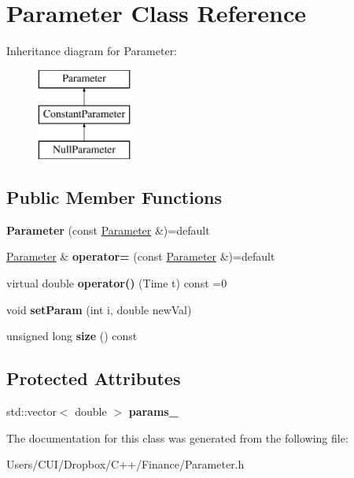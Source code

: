 \hypertarget{class_parameter}{}\section{Parameter Class Reference}
\label{class_parameter}
Inheritance diagram for Parameter\+:\begin{figure}[H]
\begin{center}
\leavevmode
\includegraphics[height=3.000000cm]{class_parameter}
\end{center}
\end{figure}
\subsection*{Public Member Functions}
\begin{DoxyCompactItemize}
\item 
\hypertarget{class_parameter_a07b46a4af924cbaea806505343d7b83a}{}\label{class_parameter_a07b46a4af924cbaea806505343d7b83a} 
{\bfseries Parameter} (const \hyperlink{class_parameter}{Parameter} \&)=default
\item 
\hypertarget{class_parameter_ac7e34f069ed1474901fce2f06e0ee54f}{}\label{class_parameter_ac7e34f069ed1474901fce2f06e0ee54f} 
\hyperlink{class_parameter}{Parameter} \& {\bfseries operator=} (const \hyperlink{class_parameter}{Parameter} \&)=default
\item 
\hypertarget{class_parameter_ae6317fac3d0b5e69101eb7059d151ca7}{}\label{class_parameter_ae6317fac3d0b5e69101eb7059d151ca7} 
virtual double {\bfseries operator()} (Time t) const =0
\item 
\hypertarget{class_parameter_a8cebb26e89537b098c8b42ef9aeb0f66}{}\label{class_parameter_a8cebb26e89537b098c8b42ef9aeb0f66} 
void {\bfseries set\+Param} (int i, double new\+Val)
\item 
\hypertarget{class_parameter_ae1ca6e3ab5f2d2ed3bffbdee6e941068}{}\label{class_parameter_ae1ca6e3ab5f2d2ed3bffbdee6e941068} 
unsigned long {\bfseries size} () const
\end{DoxyCompactItemize}
\subsection*{Protected Attributes}
\begin{DoxyCompactItemize}
\item 
\hypertarget{class_parameter_abcbcc6573234afb8f6027d3c716917bb}{}\label{class_parameter_abcbcc6573234afb8f6027d3c716917bb} 
std\+::vector$<$ double $>$ {\bfseries params\+\_\+}
\end{DoxyCompactItemize}


The documentation for this class was generated from the following file\+:\begin{DoxyCompactItemize}
\item 
Users/\+C\+U\+I/\+Dropbox/\+C++/\+Finance/Parameter.\+h\end{DoxyCompactItemize}
